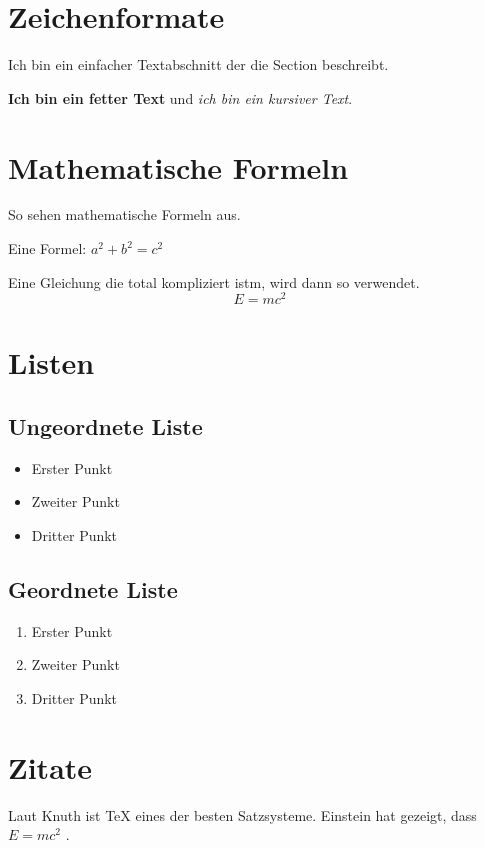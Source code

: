 \section{Zeichenformate}
Ich bin ein einfacher Textabschnitt der die Section beschreibt.

\textbf{Ich bin ein fetter Text} und \textit{ich bin ein kursiver Text}.

\section{Mathematische Formeln}
So sehen mathematische Formeln aus.

Eine Formel: \(a^2 + b^2 = c^2\)

Eine Gleichung die total kompliziert istm, wird dann so verwendet.
\[
  E = mc^2
\]

\section{Listen}

\subsection{Ungeordnete Liste}
\begin{itemize}
  \item Erster Punkt
  \item Zweiter Punkt
  \item Dritter Punkt
\end{itemize}

\subsection{Geordnete Liste}
\begin{enumerate}
  \item Erster Punkt
  \item Zweiter Punkt
  \item Dritter Punkt
\end{enumerate}





\section{Zitate}
Laut Knuth \cite{knuth1984tex} ist TeX eines der besten Satzsysteme.
Einstein hat gezeigt, dass \(E = mc^2\) \cite{einstein1905relativity}.
